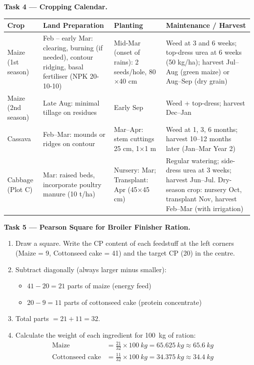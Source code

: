 \documentclass[11pt]{article}
\begin{document}
\textbf{Task 4 — Cropping Calendar.}\par
\begin{center}
\begin{tabularx}{\linewidth}{|l|X|X|X|}
\hline
\rowcolor{popblueL} \textbf{Crop} & \textbf{Land Preparation} & \textbf{Planting} & \textbf{Maintenance / Harvest} \\
\hline
Maize (1st season) & Feb -- early Mar: clearing, burning (if needed), contour ridging, basal fertiliser (NPK 20-10-10) & Mid-Mar (onset of rains): 2 seeds/hole, 80$\times$40 cm & Weed at 3 and 6 weeks; top-dress urea at 6 weeks (50 kg/ha); harvest Jul--Aug (green maize) or Aug--Sep (dry grain) \\
\hline
Maize (2nd season) & Late Aug: minimal tillage on residues & Early Sep & Weed + top-dress; harvest Dec--Jan \\
\hline
Cassava & Feb--Mar: mounds or ridges on contour & Mar--Apr: stem cuttings 25 cm, 1$\times$1 m & Weed at 1, 3, 6 months; harvest 10--12 months later (Jan--Mar Year 2) \\
\hline
Cabbage (Plot C) & Mar: raised beds, incorporate poultry manure (10 t/ha) & Nursery: Mar; Transplant: Apr (45$\times$45 cm) & Regular watering; side-dress urea at 3 weeks; harvest Jun--Jul. Dry-season crop: nursery Oct, transplant Nov, harvest Feb--Mar (with irrigation) \\
\hline
\end{tabularx}
\end{center}

\textbf{Task 5 — Pearson Square for Broiler Finisher Ration.}\par
\begin{methode}
\begin{enumerate}
\item Draw a square. Write the CP content of each feedstuff at the left corners (Maize = 9, Cottonseed cake = 41) and the target CP (20) in the centre.
\item Subtract diagonally (always larger minus smaller):
\begin{itemize}
\item $41 - 20 = 21$ parts of maize (energy feed)
\item $20 - 9 = 11$ parts of cottonseed cake (protein concentrate)
\end{itemize}
\item Total parts $= 21 + 11 = 32$.
\item Calculate the weight of each ingredient for \SI{100}{kg} of ration:
\begin{align*}
\text{Maize} &= \frac{21}{32} \times \SI{100}{kg} = \SI{65.625}{kg} \approx \SI{65.6}{kg} \\
\text{Cottonseed cake} &= \frac{11}{32} \times \SI{100}{kg} = \SI{34.375}{kg} \approx \SI{34.4}{kg}
\end{align*}
\end{enumerate}
\end{methode}
\end{document}

